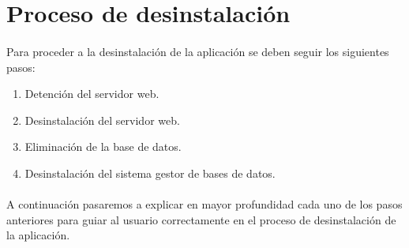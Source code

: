 \section{Proceso de desinstalación}

  \paragraph{}Para proceder a la desinstalación de la aplicación se deben seguir
  los siguientes pasos:

  \begin{enumerate}
   \item Detención del servidor web.
   \item Desinstalación del servidor web.
   \item Eliminación de la base de datos.
   \item Desinstalación del sistema gestor de bases de datos.
  \end{enumerate}

  \paragraph{}A continuación pasaremos a explicar en mayor profundidad cada
  uno de los pasos anteriores para guiar al usuario correctamente en el proceso
  de desinstalación de la aplicación.

  \begin{enumerate}
    
    
    
    
  \end{enumerate}
